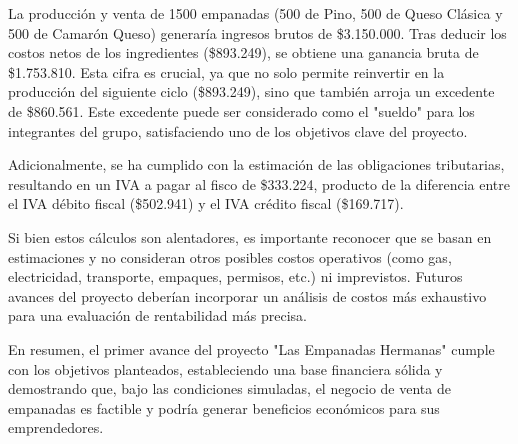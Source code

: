 \documentclass[12pt]{article}
\begin{document}
La producción y venta de 1500 empanadas (500 de Pino, 500 de Queso Clásica y 500 de Camarón Queso) generaría ingresos brutos de \$3.150.000. Tras deducir los costos netos de los ingredientes (\$893.249), se obtiene una ganancia bruta de \$1.753.810. Esta cifra es crucial, ya que no solo permite reinvertir en la producción del siguiente ciclo (\$893.249), sino que también arroja un excedente de \$860.561. Este excedente puede ser considerado como el "sueldo" para los integrantes del grupo, satisfaciendo uno de los objetivos clave del proyecto.

Adicionalmente, se ha cumplido con la estimación de las obligaciones tributarias, resultando en un IVA a pagar al fisco de \$333.224, producto de la diferencia entre el IVA débito fiscal (\$502.941) y el IVA crédito fiscal (\$169.717).

Si bien estos cálculos son alentadores, es importante reconocer que se basan en estimaciones y no consideran otros posibles costos operativos (como gas, electricidad, transporte, empaques, permisos, etc.) ni imprevistos. Futuros avances del proyecto deberían incorporar un análisis de costos más exhaustivo para una evaluación de rentabilidad más precisa.

En resumen, el primer avance del proyecto "Las Empanadas Hermanas" cumple con los objetivos planteados, estableciendo una base financiera sólida y demostrando que, bajo las condiciones simuladas, el negocio de venta de empanadas es factible y podría generar beneficios económicos para sus emprendedores.
\end{document}
